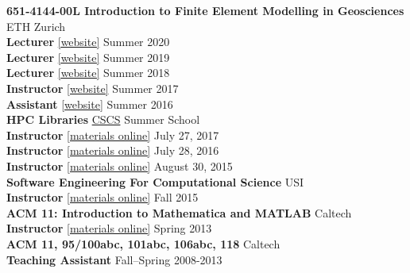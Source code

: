 \documentclass[a4paper,11pt]{article}
\newenvironment{tightitemize}
{ \begin{itemize}
  \setlength{\itemsep}{0pt}
  \setlength{\parskip}{0pt}
  \setlength{\parsep}{0pt}
    \vspace{-0.5cm}}
{ \end{itemize} }
\begin{document}
{\textbf{651-4144-00L Introduction to Finite Element Modelling in Geosciences}
\hfill ETH Zurich \\
\textbf{Lecturer}
\href{http://jupiter.ethz.ch/~gfdteaching/femblockcourse/2020/}{[website]}
\hfill {Summer 2020} \\
\textbf{Lecturer}
\href{http://jupiter.ethz.ch/~gfdteaching/femblockcourse/2019/}{[website]}
\hfill {Summer 2019} \\
\textbf{Lecturer}
\href{http://jupiter.ethz.ch/~gfdteaching/femblockcourse/2018/}{[website]}
\hfill {Summer 2018} \\
\textbf{Instructor}
\href{https://jupiter2.ethz.ch/~gfdteaching/femblockcourse/2017/}{[website]}
\hfill {Summer 2017} \\
\textbf{Assistant}
\href{http://jupiter.ethz.ch/~gfdteaching/femblockcourse/2016/}{[website]}
\hfill {Summer 2016}\\

\textbf{HPC Libraries}
\hfill \href{https://cscs.ch}{CSCS} Summer School\\
\textbf{Instructor}
\href{https://github.com/eth-cscs/SummerSchool2017}{[materials online]}
\hfill {July 27, 2017} \\
\textbf{Instructor}
\href{https://github.com/eth-cscs/SummerSchool2016}{[materials online]}
\hfill {July 28, 2016}\\
\textbf{Instructor}
\href{https://github.com/eth-cscs/SummerSchool2015/tree/master/libraries}{[materials online]}
\hfill {August 30, 2015} \\

\textbf{Software Engineering For Computational Science}
\hfill USI \\
\textbf{Instructor}
\href{https://bitbucket.org/psanan/sefcs2015}{[materials online]}
\hfill {Fall 2015} \\

\textbf{ACM 11: Introduction to Mathematica and MATLAB} \hfill Caltech\\
\textbf{Instructor}
\href{https://bitbucket.org/psanan/introduction-to-matlab-and-mathematica}{[materials online]}
\hfill {Spring 2013} \\

\textbf{ACM 11, 95/100abc, 101abc, 106abc, 118} \hfill Caltech\\
\textbf{Teaching Assistant}
\hfill {Fall--Spring 2008-2013} \\

}
\end{document}
